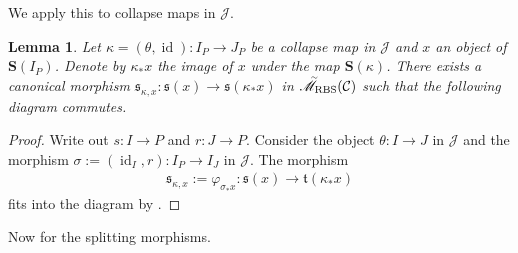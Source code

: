 \documentclass[12pt, reqno]{amsart}
\theoremstyle{plain}
\newtheorem{lemma}[theorem]{Lemma}
\theoremstyle{definition}
\renewcommand{\phi}{\varphi}
\begin{document}
We apply this to collapse maps in $\mathcal{J}$.

\begin{lemma}
Let $\kappa=(\theta,\operatorname{id})\colon I_P\rightarrow J_P$ be a collapse map in $\mathcal{J}$ and $x$ an object of $\mathbf{S}(I_P)$. Denote by $\kappa_*x$ the image of $x$ under the map $\mathbf{S}(\kappa)$. There exists a canonical morphism $\mathfrak{s}_{\kappa,x}\colon \mathfrak{s}(x) \rightarrow \mathfrak{s}(\kappa_*x)$ in $\accentset{\sim}{\mathscr{M}}_{\operatorname{RBS}}(\mathcal{C})$ such that the following diagram commutes.
\begin{center}
\end{center}
\end{lemma}
\begin{proof}
Write out $s\colon I\rightarrow P$ and $r\colon J\rightarrow P$.
Consider the object $\theta\colon I\rightarrow J$ in $\mathcal{J}$ and the morphism $\sigma:=(\operatorname{id}_I, r)\colon I_P\rightarrow I_J$ in $\mathcal{J}$. The morphism
\begin{align*}
\mathfrak{s}_{\kappa,x} := \phi_{\sigma_*x}\colon \mathfrak{s}(x)\rightarrow \mathfrak{t}(\kappa_*x)
\end{align*}
fits into the diagram by .
\end{proof}





Now for the splitting morphisms.
\end{document}
